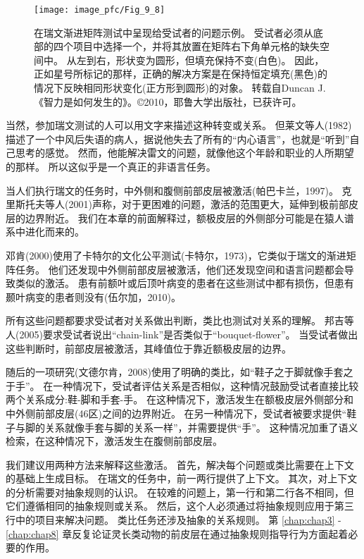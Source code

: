 \begin{figure}[!htb]
	\centering
	\texttt{[image: image\_pfc/Fig\_9\_8]}
	\caption{在瑞文渐进矩阵测试中呈现给受试者的问题示例。
		受试者必须从底部的四个项目中选择一个，并将其放置在矩阵右下角单元格的缺失空间中。
		从左到右，形状变为圆形，但填充保持不变(白色)。
		因此，正如星号所标记的那样，正确的解决方案是在保持恒定填充(黑色)的情况下反映相同形状变化(正方形到圆形)的对象。
		转载自Duncan J.《智力是如何发生的》。©2010，耶鲁大学出版社，已获许可。\label{fig:fig_9_8}}
\end{figure}


当然，参加瑞文测试的人可以用文字来描述这种转变或关系。
但莱文等人(1982)描述了一个中风后失语的病人，据说他失去了所有的“内心语言”，也就是“听到”自己思考的感觉。
然而，他能解决雷文的问题，就像他这个年龄和职业的人所期望的那样。
所以这似乎是一个真正的非语言任务。


当人们执行瑞文的任务时，中外侧和腹侧前部皮层被激活(帕巴卡兰，1997)。
克里斯托夫等人(2001)声称，对于更困难的问题，激活的范围更大，延伸到极前部皮层的边界附近。
我们在本章的前面解释过，额极皮层的外侧部分可能是在猿人谱系中进化而来的。


邓肯(2000)使用了卡特尔的文化公平测试(卡特尔，1973)，它类似于瑞文的渐进矩阵任务。
他们还发现中外侧前部皮层被激活，他们还发现空间和语言问题都会导致类似的激活。
患有前额叶或后顶叶病变的患者在这些测试中都有损伤，但患有颞叶病变的患者则没有(伍尔加，2010)。


所有这些问题都要求受试者对关系做出判断，类比也测试对关系的理解。
邦吉等人(2005)要求受试者说出“chain-link”是否类似于“bouquet-flower”。
当受试者做出这些判断时，前部皮层被激活，其峰值位于靠近额极皮层的边界。


随后的一项研究(文德尔肯，2008)使用了明确的类比，如“鞋子之于脚就像手套之于手”。
在一种情况下，受试者评估关系是否相似，这种情况鼓励受试者直接比较两个关系成分:鞋-脚和手套-手。
在这种情况下，激活发生在额极皮层外侧部分和中外侧前部皮层(46区)之间的边界附近。
在另一种情况下，受试者被要求提供“鞋子与脚的关系就像手套与脚的关系一样”，并需要提供“手”。
这种情况加重了语义检索，在这种情况下，激活发生在腹侧前部皮层。


我们建议用两种方法来解释这些激活。
首先，解决每个问题或类比需要在上下文的基础上生成目标。
在瑞文的任务中，前一两行提供了上下文。
其次，对上下文的分析需要对抽象规则的认识。
在较难的问题上，第一行和第二行各不相同，但它们遵循相同的抽象规则或关系。
然后，这个人必须通过将抽象规则应用于第三行中的项目来解决问题。
类比任务还涉及抽象的关系规则。
第 \ref{chap:chap3} - \ref{chap:chap8} 章反复论证灵长类动物的前皮层在通过抽象规则指导行为方面起着必要的作用。


